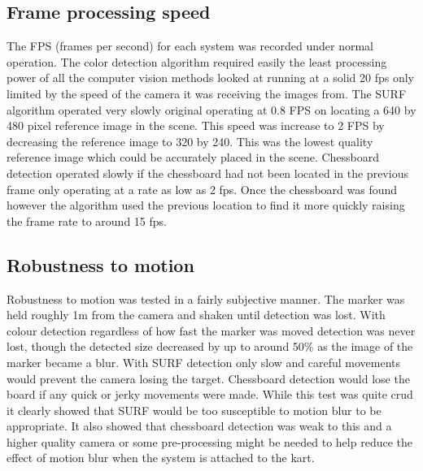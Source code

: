 \subsection{Frame processing speed}
The FPS (frames per second) for each system was recorded under normal operation. The color detection algorithm required easily the least processing power of all the computer vision methods looked at running at a solid 20 fps only limited by the speed of the camera it was receiving the images from. The SURF algorithm operated very slowly original operating at 0.8 FPS on locating a 640 by 480 pixel reference image in the scene. This speed was increase to 2 FPS by decreasing the reference image to 320 by 240. This was the lowest quality reference image which could be accurately placed in the scene. Chessboard detection operated slowly if the chessboard had not been located in the previous frame only operating at a rate as low as 2 fps. Once the chessboard was found however the algorithm used the previous location to find it more quickly raising the frame rate to around 15 fps.

\subsection{Robustness to motion}
Robustness to motion was tested in a fairly subjective manner. The marker was held roughly 1m from the camera and shaken until detection was lost. With colour detection regardless of how fast the marker was moved detection was never lost, though the detected size decreased by up to around 50\% as the image of the marker became a blur. With SURF detection only slow and careful movements would prevent the camera losing the target. Chessboard detection would lose the board if any quick or jerky movements were made. While this test was quite crud it clearly showed that SURF would be too susceptible to motion blur to be appropriate. It also showed that chessboard detection was weak to this and a higher quality camera or some pre-processing might be needed to help reduce the effect of motion blur when the system is attached to the kart.

